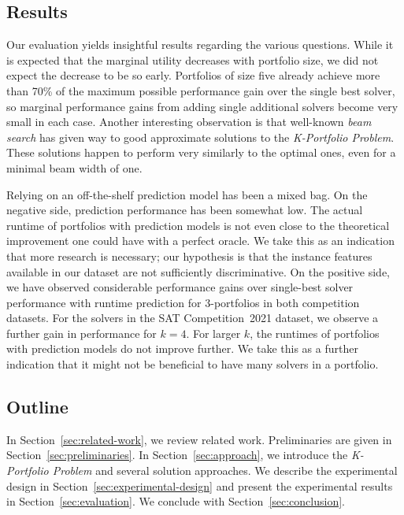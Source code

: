 \documentclass[a4paper,USenglish,pdfa]{lipics-v2021} %
\begin{document}
\subsection{Results}

Our evaluation yields insightful results regarding the various questions. 
While it is expected that the marginal utility decreases with portfolio size, we did not expect the decrease to be so early. 
Portfolios of size five already achieve more than 70\% of the maximum possible performance gain over the single best solver, so marginal performance gains from adding single additional solvers become very small in each case. 
Another interesting observation is that well-known \emph{beam search} has given way to good approximate solutions to the \emph{K-Portfolio Problem}. 
These solutions happen to perform very similarly to the optimal ones, even for a minimal beam width of one.

Relying on an off-the-shelf prediction model has been a mixed bag. 
On the negative side, prediction performance has been somewhat low. 
The actual runtime of portfolios with prediction models is not even close to the theoretical improvement one could have with a perfect oracle.
We take this as an indication that more research is necessary; our hypothesis is that the instance features available in our dataset are not sufficiently discriminative. 
On the positive side, we have observed considerable performance gains over single-best solver performance with runtime prediction for $3$-portfolios in both competition datasets. 
For the solvers in the SAT Competition~2021 dataset, we observe a further gain in performance for $k = 4$. 
For larger $k$, the runtimes of portfolios with prediction models do not improve further. 
We take this as a further indication that it might not be beneficial to have many solvers in a portfolio. 

\subsection{Outline}

In Section~\ref{sec:related-work}, we review related work. 
Preliminaries are given in Section~\ref{sec:preliminaries}. 
In Section~\ref{sec:approach}, we introduce the \emph{K-Portfolio Problem} and several solution approaches. 
We describe the experimental design in Section~\ref{sec:experimental-design} and present the experimental results in Section~\ref{sec:evaluation}. 
We conclude with Section~\ref{sec:conclusion}. 
\end{document}
